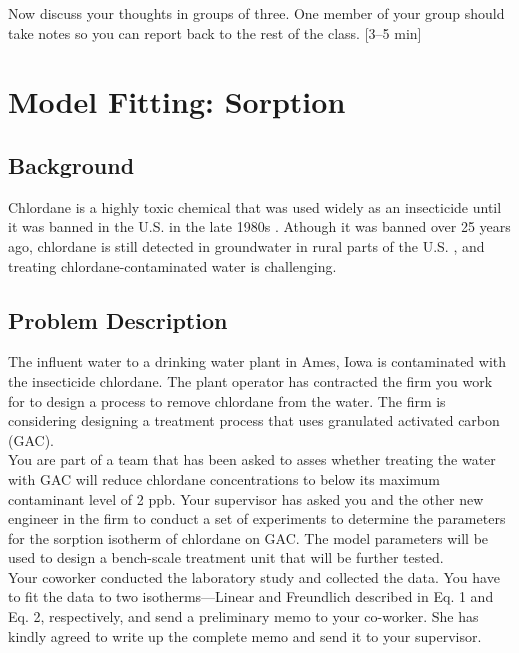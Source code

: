\documentclass[12pt,letterpaper]{article}
\begin{document}
Now discuss your thoughts in groups of three. One member of your group should take notes so you can report back to the rest of the class. [3--5 min] 

\section *{Model Fitting: Sorption}

\subsection *{Background}
Chlordane is a highly toxic chemical that was used widely as an insecticide until it was banned in the U.S. in the late 1980s \cite{army2009}.  Athough it was banned over 25 years ago, chlordane is still detected in groundwater in rural parts of the U.S. \cite{bidel2004}, and treating chlordane-contaminated water is challenging.

\subsection *{Problem Description}
The influent water to a drinking water plant in Ames, Iowa is contaminated with the insecticide chlordane. The plant operator has contracted the firm you work for to design a  process to remove chlordane from the water. The firm is considering designing a treatment process that uses granulated activated carbon (GAC).\\

You are part of a team that has been asked to asses whether treating the water with GAC will reduce chlordane concentrations to below its maximum contaminant level of 2 ppb. Your supervisor has asked you and the other new engineer in the firm to conduct a set of experiments to determine the parameters for the sorption isotherm of chlordane on GAC.  The model  parameters will be used to design a bench-scale treatment unit that will be further tested.\\

Your coworker conducted the laboratory study and collected the data. You have to fit the data to two isotherms---Linear and Freundlich described in Eq. 1 and Eq. 2, respectively, and send a preliminary memo to your co-worker.  She has kindly agreed to write up the complete memo and send it to your supervisor.\\
\end{document}
